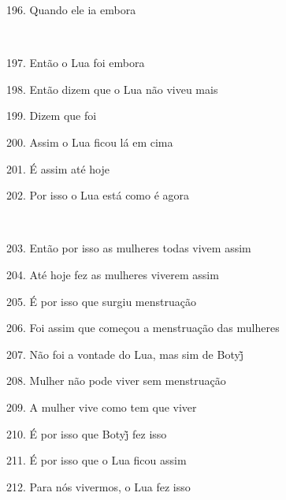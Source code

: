 196. Quando ele ia embora

~

197. Então o Lua foi embora

198. Então dizem que o Lua não viveu mais

199. Dizem que foi

200. Assim o Lua ficou lá em cima

201. É assim até hoje

202. Por isso o Lua está como é agora

~

203. Então por isso as mulheres todas vivem assim

204. Até hoje fez as mulheres viverem assim

205. É por isso que surgiu menstruação

206. Foi assim que começou a menstruação das mulheres

207. Não foi a vontade do Lua, mas sim de Botyj̃

208. Mulher não pode viver sem menstruação

209. A mulher vive como tem que viver

210. É por isso que Botyj̃ fez isso

211. É por isso que o Lua ficou assim

212. Para nós vivermos, o Lua fez isso